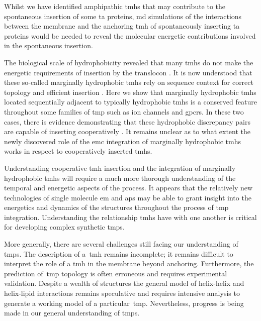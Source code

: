 Whilst we have identified amphipathic \gls{tmh}s that may contribute to the spontaneous insertion of some \gls{ta} proteins, \gls{md} simulations of the interactions between the membrane and the anchoring \gls{tmh} of spontaneously inserting \gls{ta} proteins would be needed to reveal the molecular energetic contributions involved in the spontaneous insertion.


The biological scale of hydrophobicity revealed that many \gls{tmh}s do not make the energetic requirements of insertion by the translocon \cite{Hessa2007}.
It is now understood that these so\--called marginally hydrophobic \gls{tmh}s rely on sequence context for correct topology \cite{Ojemalm2012} and efficient insertion \cite{Hedin2010, Junne2017, Virkki2014}.
Here we show that marginally hydrophobic \gls{tmh}s located sequentially adjacent to typically hydrophobic \gls{tmh}s is a conserved feature throughout some families of \gls{tmp} such as ion channels and \gls{gpcr}s.
In these two cases, there is evidence demonstrating that these hydrophobic discrepancy pairs are capable of inserting cooperatively \cite{Ismail2008, Zhang2007, Sato2002, Sato2003, Cymer2015}.
It remains unclear as to what extent the newly discovered role of the \gls{emc} integration of marginally hydrophobic \gls{tmh}s \cite{Shurtleff2018} works in respect to cooperatively inserted \gls{tmh}s.

Understanding cooperative \gls{tmh} insertion and the integration of marginally hydrophobic \gls{tmh}s will require a much more thorough understanding of the temporal and energetic aspects of the process.
It appears that the relatively new technologies of single molecule \gls{em} and \gls{ap}s may be able to grant insight into the energetics and dynamics of the structures throughout the process of \gls{tmp} integration.
Understanding the relationship \gls{tmh}s have with one another is critical for developing complex synthetic \gls{tmp}s.

More generally, there are several challenges still facing our understanding of \gls{tmp}s.
The description of a~\gls{tmh} remains incomplete; it remains difficult to interpret the role of a \gls{tmh} in the membrane beyond anchoring.
Furthermore, the prediction of~\gls{tmp} topology is often erroneous and requires experimental validation.
Despite a wealth of structures the general model of helix\--helix and helix\--lipid interactions remains speculative and requires intensive analysis to generate a working model of a particular~\gls{tmp}.
Nevertheless, progress is being made in our general understanding of \gls{tmp}s.
